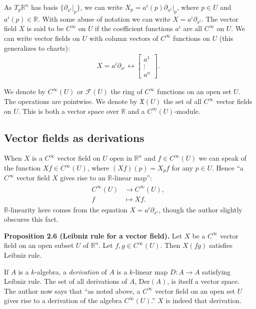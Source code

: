 \documentclass[a4paper]{article}
\newcommand{\R}{\mathbb{R}}
\begin{document}
As $T_p\R^n$ has basis $\{\partial_{x^i}|_p\}$, we can write $X_p = a^i(p)\partial_{x^i}|_p$, where $p \in U$ and $a^i(p) \in \R$. With some abuse of notation we can write $X = a^i \partial_{x^i}$. The vector field $X$ is said to be $C^\infty$ on $U$ if the coefficient functions $a^i$ are all $C^\infty$ on $U$. We can write vector fields on $U$ with column vectors of $C^\infty$ functions on $U$ (this generalizes to charts):
\begin{align}
    X = a^i\partial_{x^i} \longleftrightarrow \begin{bmatrix} a^1 \\ \vdots \\ a^n \end{bmatrix}.
\end{align}

We denote by $C^\infty(U)$ or $\mathcal{F}(U)$ the ring of $C^\infty$ functions on an open set $U$. The operations are pointwise. We denote by $\mathfrak{X}(U)$ the set of all $C^\infty$ vector fields on $U$. This is both a vector space over $\R$ and a $C^\infty(U)$-module.

\subsection{Vector fields as derivations}

When $X$ is a $C^\infty$ vector field on $U$ open in $\R^n$ and $f \in C^\infty(U)$ we can speak of the function $Xf \in C^\infty(U)$, where $(Xf)(p) = X_pf$ for any $p \in U$. Hence ``a $C^\infty$ vector field $X$ gives rise to an $\R$-linear map'':
\begin{align}
\begin{split}
    C^\infty(U) &\to C^\infty(U), \\
    f &\mapsto Xf.
\end{split}
\end{align}
$\R$-linearity here comes from the equation $X = a^i\partial_{x^i}$, though the author slightly obscures this fact.

\textbf{Proposition 2.6 (Leibniz rule for a vector field).} Let $X$ be a $C^\infty$ vector field on an open subset $U$ of $\R^n$. Let $f, g \in C^\infty(U)$. Then $X(fg)$ satisfies Leibniz rule.

If $A$ is a $k$-algebra, a \emph{derivation} of $A$ is a $k$-linear map $D : A \to A$ satisfying Leibniz rule. The set of all derivations of $A$, $\text{Der}(A)$, is itself a vector space. The author now says that ``as noted above, a $C^\infty$ vector field on an open set $U$ gives rise to a derivation of the algebra $C^\infty(U)$.'' $X$ is indeed that derivation.
\end{document}
